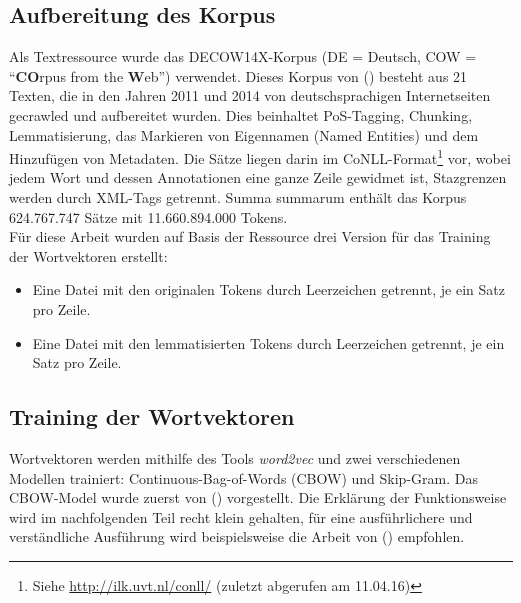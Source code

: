   \subsection{Aufbereitung des Korpus}\label{sec:corpusprep}

  Als Textressource wurde das DECOW14X-Korpus (DE = Deutsch, COW = ``\textbf{CO}rpus from the \textbf{W}eb'') verwendet.
  Dieses Korpus von (\cite{schafer2012building})  besteht aus 21 Texten,
  die in den Jahren 2011 und 2014 von deutschsprachigen Internetseiten gecrawled und aufbereitet wurden. Dies beinhaltet
  PoS-Tagging, Chunking, Lemmatisierung, das Markieren von Eigennamen (Named Entities) und dem Hinzufügen von Metadaten.
  Die Sätze liegen darin im CoNLL-Format\footnote{Siehe \url{http://ilk.uvt.nl/conll/} (zuletzt abgerufen am 11.04.16)} vor,
  wobei jedem Wort und dessen Annotationen eine ganze Zeile gewidmet ist,
  Stazgrenzen werden durch XML-Tags getrennt. Summa summarum enthält das Korpus 624.767.747 Sätze mit 11.660.894.000 Tokens.\\

  Für diese Arbeit wurden auf Basis der Ressource drei Version für das Training der Wortvektoren erstellt:
  \begin{itemize}
      \item Eine Datei mit den originalen Tokens durch Leerzeichen getrennt, je ein Satz pro Zeile.
      \item Eine Datei mit den lemmatisierten Tokens durch Leerzeichen getrennt, je ein Satz pro Zeile.
  \end{itemize}


  \subsection{Training der Wortvektoren}\label{sec:vectrain}

  Wortvektoren werden mithilfe des Tools \emph{word2vec} und zwei verschiedenen Modellen trainiert: Continuous-Bag-of-Words (CBOW)
  und Skip-Gram. Das CBOW-Model wurde zuerst von (\cite{mikolov2013efficient}) vorgestellt. Die Erklärung der Funktionsweise
  wird im nachfolgenden Teil recht klein gehalten, für eine ausführlichere und verständliche Ausführung wird beispielsweise
  die Arbeit von (\cite{rong2014word2vec}) empfohlen.\\

